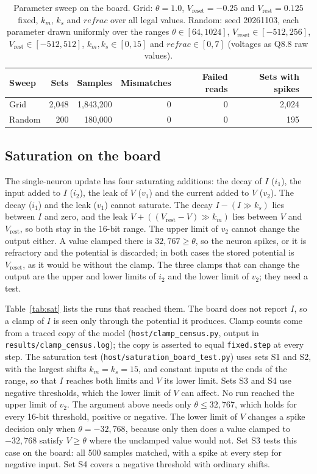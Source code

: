 \documentclass[11pt]{article}
\begin{document}
\begin{table}[t]
\centering
\caption{Parameter sweep on the board. Grid: $\theta=1.0$, $V_{\mathrm{reset}}=-0.25$ and $V_{\mathrm{rest}}=0.125$ fixed, $k_m$, $k_s$ and $\mathit{refrac}$ over all legal values. Random: seed 20261103, each parameter drawn uniformly over the ranges $\theta\in[64,1024]$, $V_{\mathrm{reset}}\in[-512,256]$, $V_{\mathrm{rest}}\in[-512,512]$, $k_m, k_s \in [0,15]$ and $\mathit{refrac}\in[0,7]$ (voltages as Q8.8 raw values).}
\label{tab:sweep}
\begin{tabular}{lrrrrrr}
\toprule
Sweep & Sets & Samples & Mismatches & Failed reads & Sets with spikes \\
\midrule
Grid & 2,048 & 1,843,200 & 0 & 0 & 2,024 \\
Random & 200 & 180,000 & 0 & 0 & 195 \\
\bottomrule
\end{tabular}
\end{table}

\subsection{Saturation on the board}
\label{sec:sat}
The single-neuron update has four saturating additions: the decay of $I$ ($i_1$), the input added to $I$ ($i_2$), the leak of $V$ ($v_1$) and the current added to $V$ ($v_2$).
The decay ($i_1$) and the leak ($v_1$) cannot saturate. The decay $I-(I\gg k_s)$ lies between $I$ and zero, and the leak $V+((V_{\mathrm{rest}}-V)\gg k_m)$ lies between $V$ and $V_{\mathrm{rest}}$, so both stay in the 16-bit range.
The upper limit of $v_2$ cannot change the output either. A value clamped there is $32{,}767 \ge \theta$, so the neuron spikes, or it is refractory and the potential is discarded; in both cases the stored potential is $V_{\mathrm{reset}}$, as it would be without the clamp.
The three clamps that can change the output are the upper and lower limits of $i_2$ and the lower limit of $v_2$; they need a test.

Table~\ref{tab:sat} lists the runs that reached them. The board does not report $I$, so a clamp of $I$ is seen only through the potential it produces. Clamp counts come from a traced copy of the model (\texttt{host/clamp\_census.py}, output in \texttt{results/clamp\_census.log}); the copy is asserted to equal \texttt{fixed.step} at every step.
The saturation test (\texttt{host/saturation\_board\_test.py}) uses sets S1 and S2, with the largest shifts $k_m=k_s=15$, and constant inputs at the ends of the range, so that $I$ reaches both limits and $V$ its lower limit. Sets S3 and S4 use negative thresholds, which the lower limit of $V$ can affect.
No run reached the upper limit of $v_2$. The argument above needs only $\theta \le 32{,}767$, which holds for every 16-bit threshold, positive or negative. The lower limit of $V$ changes a spike decision only when $\theta = -32{,}768$, because only then does a value clamped to $-32{,}768$ satisfy $V \ge \theta$ where the unclamped value would not. Set S3 tests this case on the board: all 500 samples matched, with a spike at every step for negative input. Set S4 covers a negative threshold with ordinary shifts.
\end{document}
